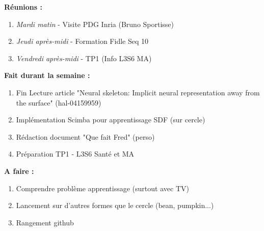 \textbf{Réunions :}
\begin{enumerate}[label=\textbullet]
	\item \textit{Mardi matin} - Visite PDG Inria (Bruno Sportisse)
	\item \textit{Jeudi après-midi} - Formation Fidle Seq 10
	\item \textit{Vendredi après-midi} - TP1 (Info L3S6 MA)
\end{enumerate}
\textbf{Fait durant la semaine :}
\begin{enumerate}[label=\textbullet]
	\item Fin Lecture article "Neural skeleton: Implicit neural representation away from the surface" (hal-04159959)
	\item Implémentation Scimba pour apprentissage SDF (sur cercle)
	\item Rédaction document "Que fait Fred" (perso)
	\item Préparation TP1 - L3S6 Santé et MA
\end{enumerate}
\textbf{A faire :}
\begin{enumerate}[label=\textbullet]
	\item Comprendre problème apprentissage (surtout avec TV)
	\item Lancement sur d'autres formes que le cercle (bean, pumpkin...)
	\item Rangement github
\end{enumerate}